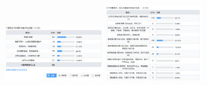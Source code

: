 \documentclass[12pt]{article}
\begin{document}
\begin{appendix}
\begin{figure}[htbp]
{\begin{minipage}[t]{0.3\linewidth}
        \includegraphics[width=1.7in]{figure/pic4.png}
        \end{minipage}
        }%
        {
        \begin{minipage}[t]{0.3\linewidth}
        \centering
        \includegraphics[width=1.7in]{figure/pic5.png}
        \end{minipage}
        }
        
        \end{figure}



\end{appendix}
\end{document}
